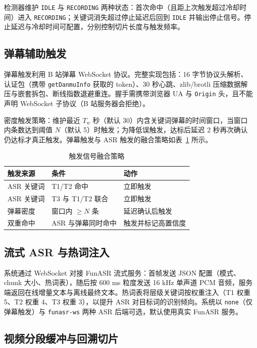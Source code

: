 \documentclass[UTF8,11pt,a4paper]{ctexart}
\begin{document}
检测器维护 \texttt{IDLE} 与 \texttt{RECORDING} 两种状态：首次命中（且距上次触发超过冷却时间）进入 \texttt{RECORDING}；关键词消失超过停止延迟后回到 \texttt{IDLE} 并输出停止信号。停止延迟与冷却时间可配置，分别控制切片长度与触发频率。

\subsection{弹幕辅助触发}

弹幕触发利用 B 站弹幕 WebSocket 协议。完整实现包括：16 字节协议头解析、认证包（携带 \texttt{getDanmuInfo} 获取的 token）、30 秒心跳、zlib/brotli 压缩数据解压与嵌套拆包、断线指数退避重连。握手需携带浏览器 UA 与 \texttt{Origin} 头，且不能声明 WebSocket 子协议（B 站服务器会拒绝）。

密度触发策略：维护最近 $T_w$ 秒（默认 30）内含关键词弹幕的时间窗口，当窗口内条数达到阈值 $N$（默认 5）时触发；为降低误触发，达标后延迟 2 秒再次确认仍达标才真正触发。弹幕触发与 ASR 触发的融合策略如表~\ref{tab:fusion} 所示。

\begin{table}[htbp]
\centering
\caption{触发信号融合策略}
\label{tab:fusion}
\begin{tabular}{@{}lll@{}}
\toprule
触发来源 & 条件 & 动作 \\
\midrule
ASR 关键词 & T1/T2 命中 & 立即触发 \\
ASR 关键词 & T3 与 T1/T2 联合 & 立即触发 \\
弹幕密度 & 窗口内 $\geq N$ 条 & 延迟确认后触发 \\
双重命中 & ASR 与弹幕同时命中 & 触发并标记高置信度 \\
\bottomrule
\end{tabular}
\end{table}

\subsection{流式 ASR 与热词注入}

系统通过 WebSocket 对接 FunASR 流式服务：首帧发送 JSON 配置（模式、chunk 大小、热词表），随后按 600 ms 粒度发送 16 kHz 单声道 PCM 音频，服务端返回在线增量文本与离线最终文本。热词表将层级关键词按权重注入（T1 权重 5、T2 权重 4、T3 权重 3），以提升 ASR 对目标词的识别倾向。系统以 \texttt{none}（仅弹幕触发）与 \texttt{funasr-ws} 两种 ASR 后端可选，默认使用真实 FunASR 服务。

\subsection{视频分段缓冲与回溯切片}
\end{document}
